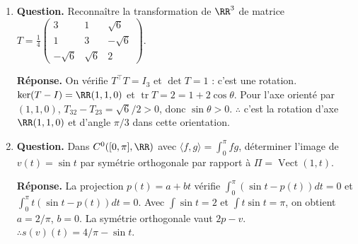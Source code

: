 \documentclass[12pt, a4paper]{article}
\begin{document}
\begin{enumerate}[label=8.\arabic*., start=70]
\begin{minipage}[t]{\linewidth}
\begin{enumerate}[\arabic*.]
\begin{enumerate}[a.]
  \item \textbf{Question.} Construire $A^{(1)}=A$, $A^{(k+1)}=H^{(k)}A^{(k)}$, avec $H^{(k)}$ de Householder, jusqu’à obtenir une matrice triangulaire supérieure.
\par\smallskip
\textbf{Réponse.} À l'étape $k$, appliquer la construction au segment $k,\ldots,n$ de la colonne $k$ de $A^{(k)}$.
            Prolonger la réflexion par l'identité sur les $k-1$ premières coordonnées.
            Les zéros déjà obtenus sont conservés ; $A^{(n+1)}=R$ est triangulaire supérieure (c'est $A^{(n+1)}$, et non $H^{(n+1)}$).

  \item \textbf{Question.} En déduire une décomposition $QR$ et établir le coût asymptotique annoncé $\sim2n^3/3$ (selon la convention de comptage).
\par\smallskip
\textbf{Réponse.} $R=H^{(n)}\cdots H^{(1)}A$, donc $A=QR$ avec $Q=H^{(1)}\cdots H^{(n)}$ orthogonale.
            En appliquant chaque réflexion sous forme de mise à jour de rang $1$, le coût dominant est
            $4\sum_{r=1}^nr^2\sim4n^3/3$ opérations scalaires, soit $2n^3/3$ paires multiplication-addition.

\end{enumerate}

\end{enumerate}
\end{minipage}

  \item \begin{minipage}[t]{\linewidth}\raggedright
\textbf{Question.} Reconnaître la transformation de $\RR^3$ de matrice $\displaystyle T=\frac14\begin{pmatrix}3&1&\sqrt6\\1&3&-\sqrt6\\-\sqrt6&\sqrt6&2\end{pmatrix}$.
\par\smallskip
\textbf{Réponse.} On vérifie $T^\top T=I_3$ et $\det T=1$ : c'est une rotation.
    $\ker(T-I)=\RR(1,1,0)$ et $\operatorname{tr}T=2=1+2\cos\theta$.
    Pour l'axe orienté par $(1,1,0)$, $T_{32}-T_{23}=\sqrt6/2>0$, donc $\sin\theta>0$.
    $\therefore$ c'est la rotation d'axe $\RR(1,1,0)$ et d'angle $\pi/3$ dans cette orientation.
\end{minipage}

  \item \begin{minipage}[t]{\linewidth}\raggedright
\textbf{Question.} Dans $C^0([0,\pi],\RR)$ avec $\langle f,g\rangle=\int_0^\pi fg$, déterminer l’image de $v(t)=\sin t$ par symétrie orthogonale par rapport à $\Pi=\operatorname{Vect}(1,t)$.
\par\smallskip
\textbf{Réponse.} La projection $p(t)=a+bt$ vérifie $\int_0^\pi(\sin t-p(t))dt=0$ et
    $\int_0^\pi t(\sin t-p(t))dt=0$.
    Avec $\int\sin t=2$ et $\int t\sin t=\pi$, on obtient $a=2/\pi$, $b=0$.
    La symétrie orthogonale vaut $2p-v$.
    $\therefore s(v)(t)=4/\pi-\sin t$.
\end{minipage}


\end{enumerate}
\end{document}
